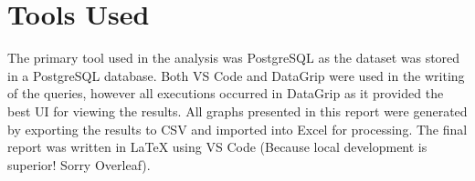 \documentclass[11pt]{article}
\begin{document}
\section{Tools Used}

The primary tool used in the analysis was PostgreSQL as the dataset was stored in a PostgreSQL database. Both VS Code and DataGrip were used in the writing of the queries, however all executions occurred in DataGrip as it provided the best UI for viewing the results. All graphs presented in this report were generated by exporting the results to CSV and imported into Excel for processing. The final report was written in LaTeX using VS Code (Because local development is superior! Sorry Overleaf).
\end{document}

